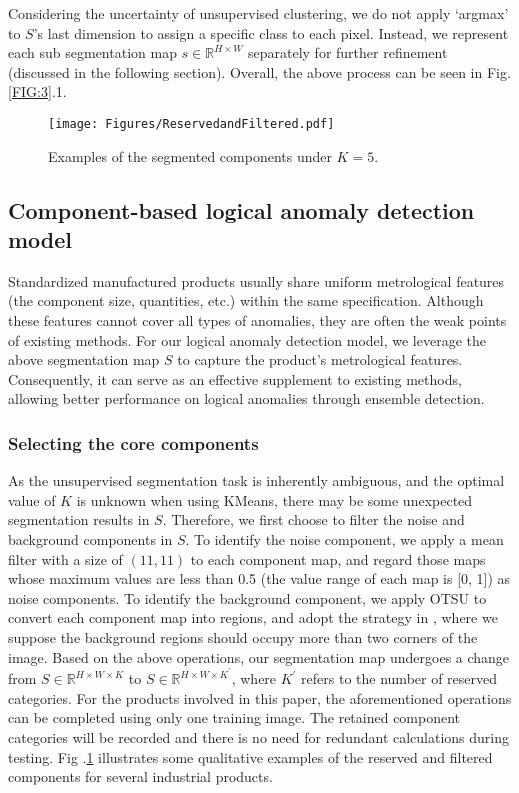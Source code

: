 \documentclass[final,5p,times,twocolumn]{elsarticle}
\begin{document}
Considering the uncertainty of unsupervised clustering, we do not apply `argmax' to $S$'s last dimension to assign a specific class to each pixel. Instead, we represent each sub segmentation map $s \in \mathbb{R}^{H \times W}$ separately for further refinement (discussed in the following section). Overall, the above process can be seen in Fig. \ref{FIG:3}.1. 
\begin{figure}
\centering
		\texttt{[image: Figures/ReservedandFiltered.pdf]}\caption{Examples of the segmented components under $K = 5$. }
	\label{FIG:4}
\end{figure}

\subsection{Component-based logical anomaly detection model}
\label{3.2}
Standardized manufactured products usually share uniform metrological features (the component size, quantities, etc.) within the same specification. Although these features cannot cover all types of anomalies, they are often the weak points of existing methods. For our logical anomaly detection model, we leverage the above segmentation map $S$ to capture the product's metrological features. Consequently, it can serve as an effective supplement to existing methods, allowing better performance on logical anomalies through ensemble detection. 

\subsubsection{Selecting the core components}
\label{3.2.1}
As the unsupervised segmentation task is inherently ambiguous, and the optimal value of $K$ is unknown when using KMeans, there may be some unexpected segmentation results in $S$. Therefore, we first choose to filter the noise and background components in $S$. To identify the noise component, we apply a mean filter with a size of $(11, 11)$ to each component map, and regard those maps whose maximum values are less than 0.5 (the value range of each map is [0, 1]) as noise components. To identify the background component, we apply OTSU \cite{otsu1979threshold} to convert each component map into regions, and adopt the strategy in \cite{wang2023cut}, where we suppose the background regions should occupy more than two corners of the image. Based on the above operations, our segmentation map undergoes a change from $S \in \mathbb{R}^{H \times W \times K}$ to $S \in \mathbb{R}^{H \times W \times K^{'}}$, where $K^{'}$ refers to the number of reserved categories. For the products involved in this paper, the aforementioned operations can be completed using only one training image. The retained component categories will be recorded and there is no need for redundant calculations during testing. Fig .\ref{FIG:4} illustrates some qualitative examples of the reserved and filtered components for several industrial products.
\end{document}
